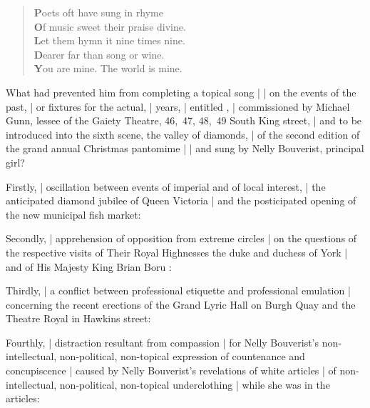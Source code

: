 \Poetry

\begin{verse}
    {\textbf{P}}oets oft have sung in rhyme\\
    {\textbf{O}}f music sweet their praise divine.\\
    {\textbf{L}}et them hymn it nine times nine.\\
    {\textbf{D}}earer far than song or wine.\\
    {\textbf{Y}}ou are mine. The world is mine.
\end{verse}


What had prevented him from completing a topical song |
 |
on the events of the past, |
or fixtures for the actual, |
years, |
entitled , |
commissioned by Michael Gunn,
lessee of the Gaiety Theatre, 46,~47, 48,~49 South King street, |
and to be introduced into the sixth scene,
the valley of diamonds, |
of the second edition
of the grand annual Christmas pantomime  |
 |
and sung by Nelly Bouverist, principal girl?

\Memories
Firstly, |
oscillation between events of imperial and of local interest, |
the anticipated diamond jubilee of Queen Victoria
 |
and the posticipated opening of the new municipal fish market:%

\Factual
Secondly, |
apprehension of opposition from extreme circles |
on the questions of the respective visits
of Their Royal Highnesses the duke and duchess of York
 |
and of His Majesty King Brian Boru
:

\Science
Thirdly, |
a conflict between professional etiquette
and professional emulation |
concerning the recent erections of the Grand Lyric Hall on Burgh Quay
and the Theatre Royal in Hawkins street:

\Philosophy
Fourthly, |
distraction resultant from compassion |
for Nelly Bouverist's non-intellectual, non-political, non-topical
expression of countenance and concupiscence |
caused by Nelly Bouverist's revelations of white articles |
of non-intellectual, non-political, non-topical underclothing |
while she
was in the articles:

